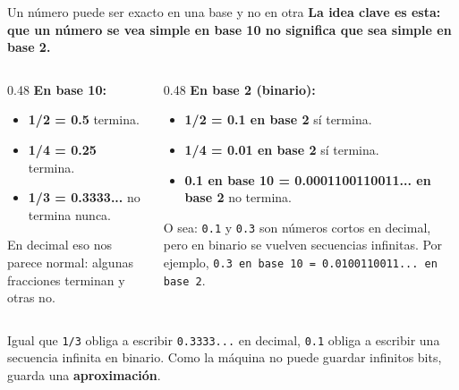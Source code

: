 \documentclass[aspectratio=169, 11pt]{beamer}
\begin{document}
\begin{frame}[shrink=30]{Un número puede ser exacto en una base y no en otra}
  \vspace{-6pt}
  {\small\color{arcaDark}\bfseries
    La idea clave es esta: \textbf{que un número se vea simple en base 10
    no significa que sea simple en base 2}.}

  \vspace{8pt}
  \begin{columns}[T]
    \begin{column}{0.48\textwidth}
      {\footnotesize\color{arcaDark}\bfseries En base 10:}
      \vspace{2pt}
      {\scriptsize\color{textMuted}
      \begin{itemize}\setlength{\itemsep}{3pt}
        \item \textbf{1/2 = 0.5} termina.
        \item \textbf{1/4 = 0.25} termina.
        \item \textbf{1/3 = 0.3333...} no termina nunca.
      \end{itemize}
      }

      \vspace{6pt}
      {\footnotesize\color{arcaDark}
        En decimal eso nos parece normal:
        algunas fracciones terminan y otras no.}
    \end{column}

    \begin{column}{0.48\textwidth}
      {\footnotesize\color{arcaDark}\bfseries En base 2 (binario):}
      \vspace{2pt}
      {\scriptsize\color{textMuted}
      \begin{itemize}\setlength{\itemsep}{3pt}
        \item \textbf{1/2 = 0.1 en base 2} sí termina.
        \item \textbf{1/4 = 0.01 en base 2} sí termina.
        \item \textbf{0.1 en base 10 = 0.0001100110011... en base 2} no termina.
      \end{itemize}
      }

      \vspace{6pt}
      {\footnotesize\color{arcaDark}
        O sea: \texttt{0.1} y \texttt{0.3} son números cortos en decimal,
        pero en binario se vuelven secuencias infinitas.
        Por ejemplo, \texttt{0.3 en base 10 = 0.0100110011... en base 2}.}
    \end{column}
  \end{columns}

  \vspace{8pt}
  {\footnotesize\color{textMuted}
    Igual que \texttt{1/3} obliga a escribir \texttt{0.3333...} en decimal,
    \texttt{0.1} obliga a escribir una secuencia infinita en binario.
    Como la máquina no puede guardar infinitos bits, guarda una
    \textbf{aproximación}.}
\end{frame}
\end{document}

